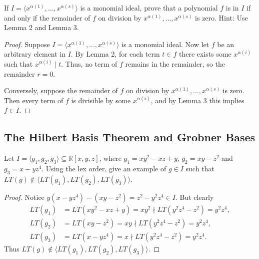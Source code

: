 \begin{tcolorbox}[title=Problem 8, breakable]
    If $I = \langle x^{\alpha(1)}, \ldots, x^{\alpha(s)} \rangle$ is a monomial ideal,
    prove that a polynomial $f$ is in $I$ if and only if the remainder of $f$ on 
    division by $x^{\alpha(1)}, \ldots, x^{\alpha(s)}$ is zero.
    Hint: Use Lemma 2 and Lemma 3.
\end{tcolorbox}

\begin{proof}
    Suppose $I = \langle x^{\alpha(1)}, \ldots, x^{\alpha(s)} \rangle$
        is a monomial ideal.
    Now let $f$ be an arbitrary element in $I$.
    By Lemma 2, for each term $t \in f$ there exists some $x^{\alpha(i)}$ such that $x^{\alpha(i)} \mid t$.
    Thus, no term of $f$ remains in the remainder, so the remainder $r = 0$.

    Conversely, suppose the remainder of $f$ on 
    division by $x^{\alpha(1)}, \ldots, x^{\alpha(s)}$ is zero.
    Then every term of $f$ is divisible by some $x^{\alpha(i)}$, 
    and by Lemma 3 this implies $f \in I$.
\end{proof}

\subsection{The Hilbert Basis Theorem and Grobner Bases}

\begin{tcolorbox}[title=Problem 1, breakable]
    Let $I = \langle g_1, g_2, g_3 \rangle \subseteq \mathbb{R}[x, y, z]$,
        where $g_1 = x y^2 - xz + y$, $g_2 = xy - z^2$
        and $g_3 = x - y z^4$.
    Using the lex order, give an example of $g \in I$
    such that $LT(g) \notin \langle LT(g_1), LT(g_2), LT(g_3) \rangle$.
\end{tcolorbox}

\begin{proof}
    Notice $y(x - yz^4) - (xy - z^2) = z^2 - y^2 z^4 \in I$.
    But clearly
    \begin{align*}
        LT(g_1) &= LT(x y^2 - xz + y) = x y^2 \nmid LT(y^2 z^4 - z^2) = y^2 z^4, \\
        LT(g_2) &= LT(xy - z^2) = xy \nmid LT(y^2 z^4 - z^2) = y^2 z^4, \\
        LT(g_3) &= LT(x - yz^4) = x \nmid LT(y^2 z^4 - z^2) = y^2 z^4.
    \end{align*}
    Thus $LT(g) \notin \langle LT(g_1), LT(g_2), LT(g_3) \rangle$.
\end{proof}

